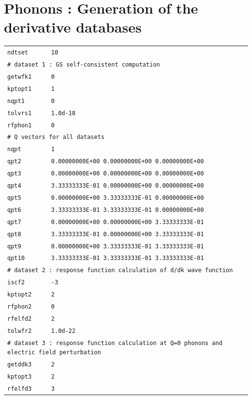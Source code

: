 \documentclass[11pt,a4paper]{article}
\begin{document}
\section{Phonons : Generation of the derivative databases}
\label{Abi10}
\begin{center}
\begin{tabular}{lll}
\texttt{ndtset} &\texttt{10}&\\
\multicolumn{3}{l}{\texttt{\# dataset 1 : GS self-consistent computation}}\\
\texttt{getwfk1} &\texttt{0}&\\
\texttt{kptopt1} &\texttt{1}&\\
\texttt{nqpt1} &\texttt{0}&\\
\texttt{tolvrs1} &\texttt{1.0d-18}&\\
\texttt{rfphon1} &\texttt{0}&\\
\multicolumn{3}{l}{\texttt{\# Q vectors for all datasets}}\\
\texttt{nqpt} &\texttt{1}&\\
\texttt{qpt2} &\texttt{0.00000000E+00  0.00000000E+00  0.00000000E+00}&\\
\texttt{qpt3} &\texttt{0.00000000E+00  0.00000000E+00  0.00000000E+00}&\\
\texttt{qpt4} &\texttt{3.33333333E-01  0.00000000E+00  0.00000000E+00}&\\
\texttt{qpt5} &\texttt{0.00000000E+00  3.33333333E-01  0.00000000E+00}&\\
\texttt{qpt6} &\texttt{3.33333333E-01  3.33333333E-01  0.00000000E+00}&\\
\texttt{qpt7} &\texttt{0.00000000E+00  0.00000000E+00  3.33333333E-01}&\\
\texttt{qpt8} &\texttt{3.33333333E-01  0.00000000E+00  3.33333333E-01}&\\
\texttt{qpt9} &\texttt{0.00000000E+00  3.33333333E-01  3.33333333E-01}&\\
\texttt{qpt10} &\texttt{3.33333333E-01  3.33333333E-01  3.33333333E-01}&\\
\multicolumn{3}{l}{\texttt{\# dataset 2 : response function calculation of d/dk wave function}}\\
\texttt{iscf2} & \texttt{-3} & \\
\texttt{kptopt2} & \texttt{2} & \\
\texttt{rfphon2} & \texttt{0} & \\
\texttt{rfelfd2} & \texttt{2} & \\
\texttt{tolwfr2} & \texttt{1.0d-22} & \\
\multicolumn{3}{l}{\texttt{\# dataset 3 : response function calculation at Q=0 phonons and electric field perturbation}}\\
\texttt{getddk3} & \texttt{2} & \\
\texttt{kptopt3} & \texttt{2} & \\
\texttt{rfelfd3} & \texttt{3} & \\
\end{tabular}
\end{center}
\end{document}
